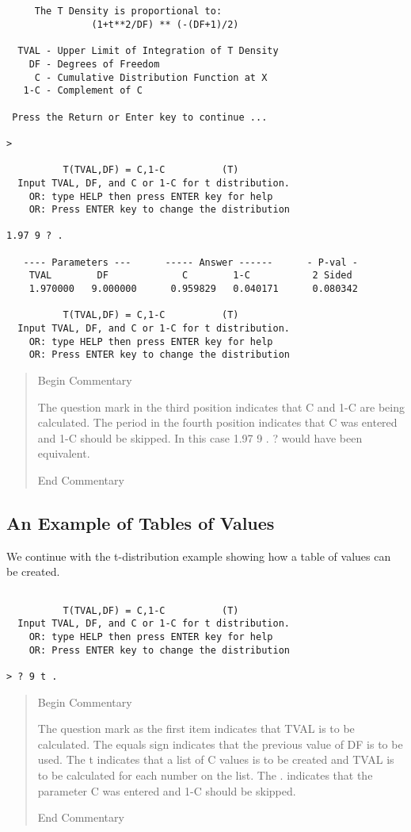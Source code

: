 \documentclass[12pt,dvips]{article}
\newcommand{\mysubsection}[1]
    {\color{green}\subsection{#1}\color{black}}
\newenvironment{commentary}{\begin{quote} \color{Orange}
\begin{center} Begin Commentary\\ \vspace{0.1in} 
\end{center} \color{black} }
{\color{Orange} \begin{center} End Commentary\\ \end{center} \color{black}
      \end{quote} \normalsize }
\begin{document}
\begin{verbatim}


     The T Density is proportional to:
               (1+t**2/DF) ** (-(DF+1)/2)

  TVAL - Upper Limit of Integration of T Density
    DF - Degrees of Freedom
     C - Cumulative Distribution Function at X
   1-C - Complement of C

 Press the Return or Enter key to continue ...

>

          T(TVAL,DF) = C,1-C          (T)
  Input TVAL, DF, and C or 1-C for t distribution.
    OR: type HELP then press ENTER key for help
    OR: Press ENTER key to change the distribution

1.97 9 ? .

   ---- Parameters ---      ----- Answer ------      - P-val -
    TVAL        DF             C        1-C           2 Sided
    1.970000   9.000000      0.959829   0.040171      0.080342

          T(TVAL,DF) = C,1-C          (T)
  Input TVAL, DF, and C or 1-C for t distribution.
    OR: type HELP then press ENTER key for help
    OR: Press ENTER key to change the distribution

\end{verbatim}

\begin{commentary}

     The question mark in the third position indicates that C and 1-C
     are being calculated. The period in the fourth position indicates
     that C was entered and 1-C should be skipped. In this case
     1.97 9 . ? would have been equivalent.

\end{commentary}

\mysubsection{An Example of Tables of Values}

We continue  with the  t-distribution example showing  how a  table of
values can be created.

\begin{verbatim}

          T(TVAL,DF) = C,1-C          (T)
  Input TVAL, DF, and C or 1-C for t distribution.
    OR: type HELP then press ENTER key for help
    OR: Press ENTER key to change the distribution

> ? 9 t .

\end{verbatim}

\begin{commentary}

     The question mark as the first item indicates that TVAL is to be
     calculated. The equals sign indicates that the previous value of DF
     is to be used. The t indicates that a list of C values is to be 
     created and TVAL is to be calculated for each number on the list.
     The . indicates that the parameter C was entered and 1-C should be
     skipped.

\end{commentary}
                                   
\end{document}
